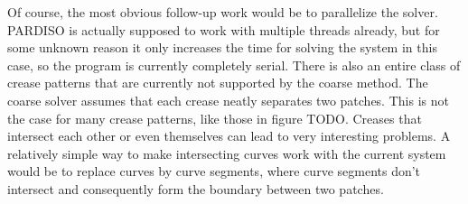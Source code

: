 \documentclass[a4paper,twoside,12pt,nochapterprefix]{scrbook}
\begin{document}
Of course, the most obvious follow-up work would be to parallelize the solver. PARDISO is actually supposed to work with multiple threads already, but for some unknown reason it only increases the time for solving the system in this case, so the program is currently completely serial.\newline
There is also an entire class of crease patterns that are currently not supported by the coarse method. The coarse solver assumes that each crease neatly separates two patches. This is not the case for many crease patterns, like those in figure TODO. Creases that intersect each other or even themselves can lead to very interesting problems. A relatively simple way to make intersecting curves work with the current system would be to replace curves by curve segments, where curve segments don't intersect and consequently form the boundary between two patches.\newline

\appendix
\cleardoublepage
{}
{}

%
\end{document}
